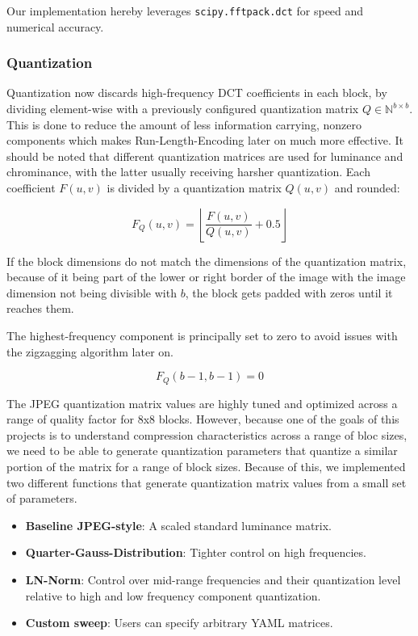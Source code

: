 Our implementation hereby leverages \texttt{scipy.fftpack.dct} for speed and numerical accuracy.

\subsubsection{Quantization}
Quantization now discards high-frequency DCT coefficients in each block, by dividing element-wise with a previously configured quantization matrix $Q \in \mathbb{N}^{b\times b}$. This is done to reduce the amount of less information carrying, nonzero components which makes Run-Length-Encoding later on much more effective. It should be noted that different quantization matrices are used for luminance and chrominance, with the latter usually receiving harsher quantization. Each coefficient $F(u,v)$ is divided by a quantization matrix $Q(u,v)$ and rounded:


\begin{equation}
F_Q(u,v) = \left\lfloor \frac{F(u,v)}{Q(u,v)} + 0.5 \right\rfloor
\end{equation}

If the block dimensions do not match the dimensions of the quantization matrix, because of it being part of the lower or right border of the image with the image dimension not being divisible with \(b\), the block gets padded with zeros until it reaches them.

The highest-frequency component is principally set to zero to avoid issues with the zigzagging algorithm later on.

\begin{equation}
	F_Q(b-1,b-1) = 0
\end{equation}

The JPEG quantization matrix values are highly tuned and optimized across a range of quality factor for 8x8 blocks.
However, because one of the goals of this projects is to understand compression characteristics across a range of bloc sizes, we need to be able to generate quantization parameters that quantize a similar portion of the matrix for a range of block sizes. 
Because of this, we implemented two different functions that generate quantization matrix values from a small set of parameters.
\begin{itemize}
    \item \textbf{Baseline JPEG-style}: A scaled standard luminance matrix.
    \item \textbf{Quarter-Gauss-Distribution}: Tighter control on high frequencies.
    \item \textbf{LN-Norm}: Control over mid-range frequencies and their quantization level relative to high and low frequency component quantization.
    \item \textbf{Custom sweep}: Users can specify arbitrary YAML matrices.
\end{itemize}

